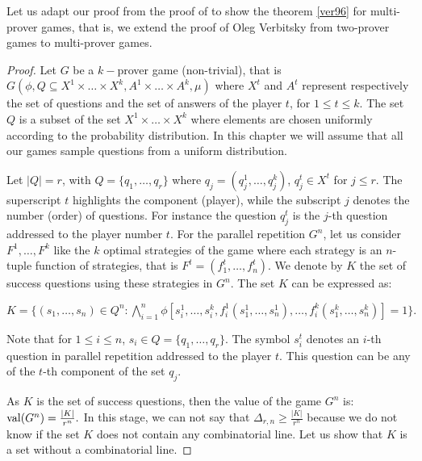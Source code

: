 Let us adapt our proof from the proof of  \cite{verbitsky1996towards} to show the theorem \eqref{ver96} for multi-prover games, that is, we extend the proof of Oleg Verbitsky from two-prover games to multi-prover games.

\begin{proof}
  Let $G$ be a $k-$prover game (non-trivial), that is $G(\phi, Q\subseteq X^1 \times \ldots \times X^k, A^1 \times \ldots \times A^k, \mu)$ where $X^t$ and $A^t$ represent respectively the set of questions and the set of answers of the player $t$, for $1\leq t \leq k.$ The set $Q$ is a subset of the set $X^1 \times \ldots \times X^k$ where elements are chosen uniformly  according to the probability distribution.  In this chapter we will assume that all our games sample questions  from a uniform distribution.

 Let $|Q|=r$, with $Q=\{q_1, \ldots, q_r\}$ where $q_j=(q_j^1,\ldots, q_j^k)$, $q_j^t \in X^t$ for $j\leq r.$ The superscript  $t$ highlights the component (player), while the subscript $j$ denotes the number (order) of questions. For instance the question $q_j^t$ is the $j$-th question addressed to the player number $t.$  For the parallel repetition $G^n$, let us consider $F^1, \ldots, F^k$ like the $k$ optimal strategies of the game where each strategy is an $n$-tuple function of strategies, that is $F^t=(f_1^t,\ldots, f_n^t)$. We denote by $K$ the set of success questions using these strategies in $G^n.$ The set $K$ can be expressed as: 
 
 $K=\{(s_1, \ldots, s_n) \in Q^n: \bigwedge\limits_{i=1}^n \phi \left[ s_i^1, \ldots, s_i^k, f_i^1(s_1^1, \ldots, s_n^1), \ldots, f_i^k(s_1^k, \ldots, s_n^k) \right]=1 \}.$

Note that for $1\leq i \leq n$,  $s_i \in Q=\{q_1, \ldots, q_r\}.$ The symbol $s_i^t$ denotes an $i$-th question in parallel repetition addressed to the player $t$. This question can be any of the $t$-th component of the set  $q_j.$
 
As $K$ is the set of success questions, then the value of the game $G^n$ is: $\mathrm{val} (G^n) = \frac{|K|}{r^n}.$
In this stage, we can not say that $\Delta_{r,n} \geq \frac{|K|}{r^n}$
because we do not know if the set  $K$ does not contain any combinatorial line. Let us show that $K$ is a set without a combinatorial line.


\end{proof}
